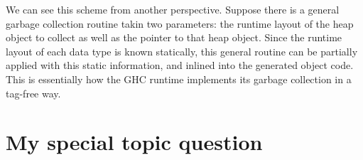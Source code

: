 \documentclass[letterpaper,11pt]{article}
\begin{document}
We can see this scheme from another perspective. Suppose there is a general
garbage collection routine takin two parameters: the runtime layout of the heap
object to collect as well as the pointer to that heap object. Since the runtime
layout of each data type is known statically, this general routine can be
partially applied with this static information, and inlined into the generated
object code. This is essentially how the GHC runtime implements its garbage
collection in a tag-free way.


\section{My special topic question}
\end{document}
